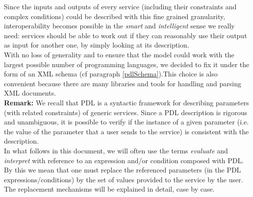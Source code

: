 \documentclass[a4paper,11pt] {ivoa}
\begin{document}
Since the inputs and outputs  of every service (including their constraints and complex conditions)
could be described with this fine grained granularity, interoperability becomes possible in the {\it
smart} and {\it intelligent} sense we really need: services should be able to work out if they can
reasonably use their output as input for another one, by simply looking at its description.\\

With no loss of generality and to ensure that the model could work with the largest possible number
of programming languages, we decided to fix it under the form of an XML schema (cf paragraph \ref{pdlSchema}).This choice is also
convenient because there are many libraries and tools for handling and parsing XML documents.\\

{\bf Remark:} We recall that PDL is a syntactic framework for describing parameters (with related
constraints) of generic services. Since a PDL description is rigorous and unambiguous, 
it is possible to verify if the instance of a given parameter (i.e. the value of the parameter
that a user sends to the service) is consistent with the description.\\
In what follows in this document, we will often use the terms {\it evaluate} and {\it interpret}
with reference to an expression and/or condition composed with PDL. By this we mean that one must
replace the referenced parameters (in the PDL expressions/conditions) by the set of values provided to the
service by the user. The replacement mechanisms will be explained in detail, case by case.
\end{document}
